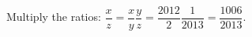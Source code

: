 Multiply the ratios: $\dfrac{x}{z}=\dfrac{x}{y}\dfrac{y}{z}=\dfrac{2012}{2}\dfrac{1}{2013}=\boxed{\dfrac{1006}{2013}}$.
